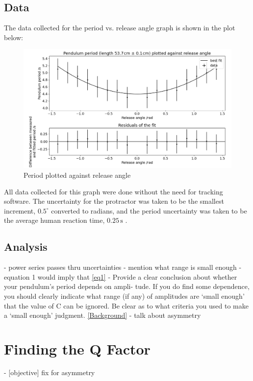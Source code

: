 \documentclass[12pt]{article}
\begin{document}
\newpage

\subsection{Data}
The data collected for the period vs. release angle graph is shown in the plot below:

\begin{figure}[!hptb]
    \centering
    \includegraphics[width=\textwidth]{../figures/period_vs_release_angle.png}
    \caption{\centering Period plotted against release angle}
    \label{fig:figure 2}
\end{figure}

All data collected for this graph were done without the need for tracking software. The uncertainty for the protractor was taken to be the smallest increment, $0.5^{\circ}$ converted to radians, and the period uncertainty was taken to be the average human reaction time, $0.25\,\text{s}$ \cite{reaction-time}.

\subsection{Analysis}
- power series passes thru uncertainties
- mention what range is small enough
- equation 1 would imply that \ref{eq1}
- Provide a clear conclusion about whether your pendulum's period depends on ampli- tude. If you do find some dependence, you should clearly indicate what range (if any) of amplitudes are `small enough' that the value of C can be ignored. Be clear as to what criteria you used to make a `small enough' judgment. \ref*{Background}
- talk about asymmetry

\section{Finding the Q Factor}
- [objective] fix for asymmetry
\end{document}
